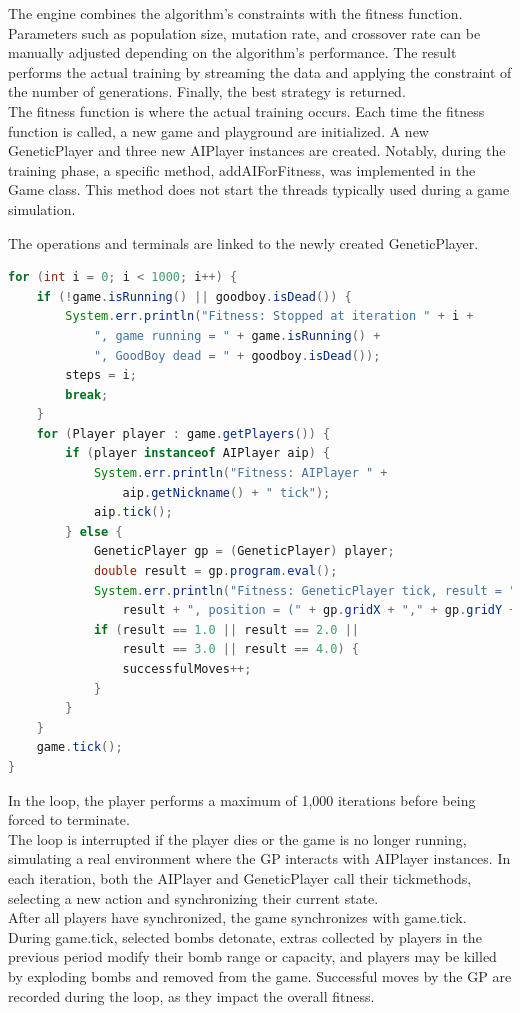 \documentclass[sigconf]{acmart} %
\begin{document}
The engine combines the algorithm's constraints with the fitness function. Parameters such as population size, mutation rate, and crossover rate can be manually adjusted depending on the algorithm's performance. The result performs the actual training by streaming the data and applying the constraint of the number of generations. Finally, the best strategy is returned. \\ 
The fitness function is where the actual training occurs. Each time the fitness function is called, a new game and playground are initialized. A new GeneticPlayer and three new AIPlayer instances are created. Notably, during the training phase, a specific method, addAIForFitness, was implemented in the Game class. This method does not start the threads typically used during a game simulation.

The operations and terminals are linked to the newly created GeneticPlayer. 

\begin{lstlisting}[language=Java]
for (int i = 0; i < 1000; i++) {
    if (!game.isRunning() || goodboy.isDead()) {
        System.err.println("Fitness: Stopped at iteration " + i +
            ", game running = " + game.isRunning() +
            ", GoodBoy dead = " + goodboy.isDead());
        steps = i;
        break;
    }
    for (Player player : game.getPlayers()) {
        if (player instanceof AIPlayer aip) {
            System.err.println("Fitness: AIPlayer " +
                aip.getNickname() + " tick");
            aip.tick();
        } else {
            GeneticPlayer gp = (GeneticPlayer) player;
            double result = gp.program.eval();
            System.err.println("Fitness: GeneticPlayer tick, result = " +
                result + ", position = (" + gp.gridX + "," + gp.gridY + ")");
            if (result == 1.0 || result == 2.0 ||
                result == 3.0 || result == 4.0) {
                successfulMoves++;
            }
        }
    }
    game.tick();
}
\end{lstlisting}

In the loop, the player performs a maximum of 1,000 iterations before being forced to terminate. \\ 
The loop is interrupted if the player dies or the game is no longer running, simulating a real environment where the GP interacts with AIPlayer instances. In each iteration, both the AIPlayer and GeneticPlayer call their tickmethods, selecting a new action and synchronizing their current state. \\ 
After all players have synchronized, the game synchronizes with game.tick. During game.tick, selected bombs detonate, extras collected by players in the previous period modify their bomb range or capacity, and players may be killed by exploding bombs and removed from the game. Successful moves by the GP are recorded during the loop, as they impact the overall fitness.
\end{document}
